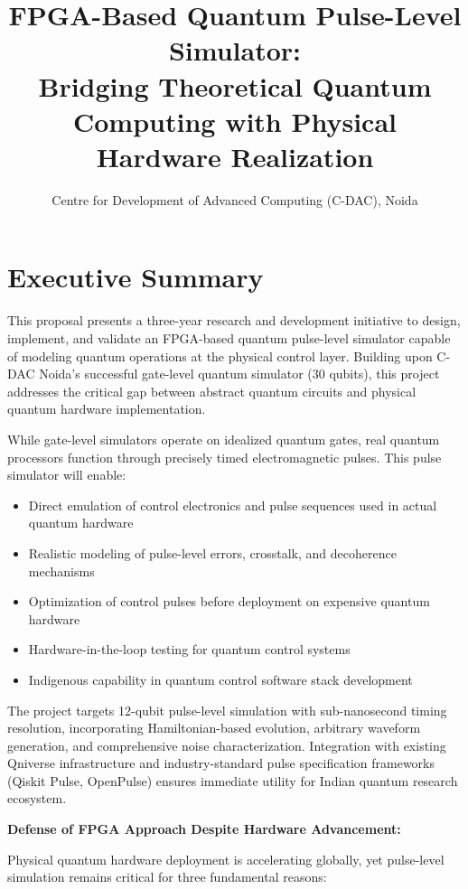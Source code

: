 \documentclass[12pt,a4paper]{article}
\title{\textbf{FPGA-Based Quantum Pulse-Level Simulator:\\Bridging Theoretical Quantum Computing with Physical Hardware Realization}}
\author{Centre for Development of Advanced Computing (C-DAC), Noida}
\date{}
\begin{document}
\maketitle

\section*{Executive Summary}

This proposal presents a three-year research and development initiative to design, implement, and validate an FPGA-based quantum pulse-level simulator capable of modeling quantum operations at the physical control layer. Building upon C-DAC Noida's successful gate-level quantum simulator (30 qubits), this project addresses the critical gap between abstract quantum circuits and physical quantum hardware implementation.

While gate-level simulators operate on idealized quantum gates, real quantum processors function through precisely timed electromagnetic pulses. This pulse simulator will enable:

\begin{itemize}[noitemsep]
\item Direct emulation of control electronics and pulse sequences used in actual quantum hardware
\item Realistic modeling of pulse-level errors, crosstalk, and decoherence mechanisms
\item Optimization of control pulses before deployment on expensive quantum hardware
\item Hardware-in-the-loop testing for quantum control systems
\item Indigenous capability in quantum control software stack development
\end{itemize}

The project targets 12-qubit pulse-level simulation with sub-nanosecond timing resolution, incorporating Hamiltonian-based evolution, arbitrary waveform generation, and comprehensive noise characterization. Integration with existing Qniverse infrastructure and industry-standard pulse specification frameworks (Qiskit Pulse, OpenPulse) ensures immediate utility for Indian quantum research ecosystem.

\textbf{Defense of FPGA Approach Despite Hardware Advancement:}

Physical quantum hardware deployment is accelerating globally, yet pulse-level simulation remains critical for three fundamental reasons:
\end{document}
